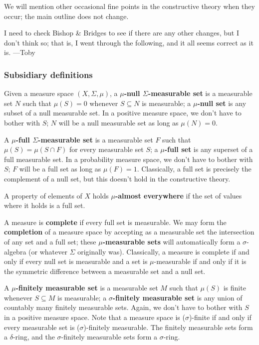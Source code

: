 \documentclass[preprint, 5p, 10pt]{elsarticle}
\theoremstyle{plain}
\begin{document}
We will mention other occasional fine points in the constructive theory when they occur; the main outline does not change.

I need to check Bishop \& Bridges to see if there are any other changes, but I don'{}t think so; that is, I went through the following, and it all seems correct as it is. ---{}Toby

\hypertarget{subsidiary_definitions_9}{}\subsubsection*{{Subsidiary definitions}}\label{subsidiary_definitions_9}

Given a measure space $(X,\Sigma,\mu)$, a \textbf{$\mu$-null $\Sigma$-measurable set} is a measurable set $N$ such that $\mu(S) = 0$ whenever $S \subseteq N$ is measurable; a \textbf{$\mu$-null set} is any subset of a null measurable set. In a positive measure space, we don'{}t have to bother with $S$; $N$ will be a null measurable set as long as $\mu(N) = 0$.

A \textbf{$\mu$-full $\Sigma$-measurable set} is a measurable set $F$ such that $\mu(S) = \mu(S \cap F)$ for every measurable set $S$; a \textbf{$\mu$-full set} is any superset of a full measurable set. In a probability measure space, we don'{}t have to bother with $S$; $F$ will be a full set as long as $\mu(F) = 1$. Classically, a full set is precisely the complement of a null set, but this doesn'{}t hold in the constructive theory.

A property of elements of $X$ holds \textbf{$\mu$-almost everywhere} if the set of values where it holds is a full set.

A measure is \textbf{complete} if every full set is measurable. We may form the \textbf{completion} of a measure space by accepting as a measurable set the intersection of any set and a full set; these \textbf{$\mu$-measurable sets} will automatically form a $\sigma$-algebra (or whatever $\Sigma$ originally was). Classically, a measure is complete if and only if every null set is measurable and a set is $\mu$-measurable if and only if it is the symmetric difference between a measurable set and a null set.

A \textbf{$\mu$-finitely measurable set} is a measurable set $M$ such that $\mu(S)$ is finite whenever $S \subseteq M$ is measurable; a \textbf{$\sigma$-finitely measurable set} is any union of countably many finitely measurable sets. Again, we don'{}t have to bother with $S$ in a positive measure space. Note that a measure space is ($\sigma$)-finite if and only if every measurable set is ($\sigma$)-finitely measurable. The finitely measurable sets form a $\delta$-ring, and the $\sigma$-finitely measurable sets form a $\sigma$-ring.
\end{document}
